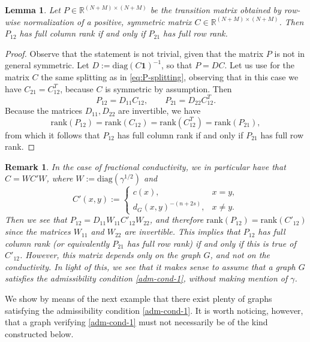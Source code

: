 \documentclass[a4paper,11pt,oneside]{amsart}
\newtheorem{lemma}[theorem]{Lemma}
\newtheorem{remark}[theorem]{Remark}
\newcommand{\R}{{\mathbb R}}
\begin{document}
\begin{lemma}
    Let $P\in \R^{(N+M)\times (N+M)}$ be the transition matrix obtained by row-wise normalization of a positive, symmetric matrix $C\in \R^{(N+M)\times (N+M)}$. Then $P_{12}$ has full column rank if and only if $P_{21}$ has full row rank.
\end{lemma}

\begin{proof}
    Observe that the statement is not trivial, given that the matrix $P$ is not in general symmetric. Let $D:= \mbox{diag}(C\mathbf 1)^{-1}$, so that $P= DC$. Let us use for the matrix $C$ the same splitting as in \eqref{eq:P-splitting}, observing that in this case we have $C_{21} = C_{12}^T$, because $C$ is symmetric by assumption. Then
    $$ P_{12} = D_{11}C_{12}, \qquad P_{21} = D_{22}C_{12}^T. $$ Because the matrices $D_{11}, D_{22}$ are invertible, we have
    $$\mbox{rank}(P_{12}) = \mbox{rank}(C_{12}) = \mbox{rank}(C_{12}^T) = \mbox{rank}(P_{21}),$$
    from which it follows that $P_{12}$ has full column rank if and only if $P_{21}$ has full row rank.
\end{proof}

\begin{remark}\label{remark-admissible-2}
In the case of fractional conductivity, we in particular have that
$C=WC'W$, where $W:=\mbox{diag}(\gamma^{1/2})$ and
    $$ C'(x,y) := \begin{cases}
    c(x), & x=y, \\
    d_G(x,y)^{-(n+2s)},  & x\neq y.
\end{cases} $$  
Then we see that $P_{12}= D_{11}W_{11}C'_{12}W_{22}$, and therefore $\mbox{rank}(P_{12}) = \mbox{rank}(C'_{12})$ since the matrices $W_{11}$ and $W_{22}$ are invertible. This implies that $P_{12}$ has full column rank (or equivalently $P_{21}$ has full row rank) if and only if this is true of $C'_{12}$. However, this matrix depends only on the graph $G$, and not on the conductivity. In light of this, we see that it makes sense to assume that a graph $G$ satisfies the admissibility condition \ref{adm-cond-1}, without making mention of $\gamma$.
\end{remark}

We show by means of the next example that there exist plenty of graphs satisfying the admissibility condition \ref{adm-cond-1}. It is worth noticing, however, that a graph verifying \ref{adm-cond-1} must not necessarily be of the kind constructed below.
\end{document}

